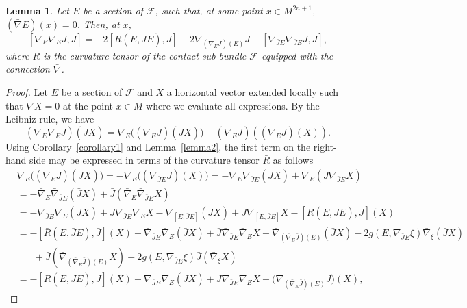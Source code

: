 \documentclass[a4paper,reqno]{amsart}
\newtheorem{lemma}[thm]{Lemma}
\theoremstyle{definition}
\theoremstyle{remark}
\theoremstyle{plain}
\numberwithin{equation}{section}
\newcommand{\f}{\mathcal{F}}
\begin{document}
\begin{lemma}\label{lemma3.2}
  Let $E$ be a section of $\f$, such that, at some point
  $x\in M^{2n+1}$, $(\bar{\nabla}E)(x)=0$. Then, at $x$,
  $$
  [\bar{\nabla}_E \bar{\nabla}_E \bar{J},\bar{J}] = -2 [\bar{R}(E,\bar{J}E),\bar{J}
  ]-2\bar{\nabla}_{(\bar{\nabla}_E \bar{J})(E)}\bar{J}- [\bar{\nabla}_{\bar{J}E}
  \bar{\nabla}_{\bar{J}E} \bar{J},\bar{J}],
  $$
where $\bar{R}$ is the curvature tensor of the contact sub-bundle
$\f$ equipped with the connection $\bar{\nabla}$.
\end{lemma}

\begin{proof}
  Let $E$ be a section of $\f$ and $X$ a horizontal vector 
  extended locally such that $\bar{\nabla} X =0$ at the point
  $x\in M$ where we evaluate all expressions.  By the Leibniz
  rule, we have
  $$
  (\bar{\nabla}_E\bar{\nabla}_E \bar{J})(\bar{J}X)=\bar{\nabla}_E
  \big((\bar{\nabla}_E \bar{J})
  (\bar{J}X)\big)-(\bar{\nabla}_{E}\bar{J})((\bar{\nabla}_E \bar{J}) (X)).
  $$
  Using Corollary~\ref{corollary1} and Lemma~\ref{lemma2}, the
  first term on the right-hand side may be expressed in terms of
  the curvature tensor $\bar{R}$ as follows
\begin{align*}
&\bar{\nabla}_E\big((\bar{\nabla}_E \bar{J}) (\bar{J}X)\big)  = -\bar{\nabla}_E\big((\bar{\nabla}_{\bar{J}E}\bar{J}) (X)\big) 
 =-\bar{\nabla}_E\bar{\nabla}_{\bar{J}E}(\bar{J}X)+\bar{\nabla}_E(\bar{J}\bar{\nabla}_{\bar{J}E}
  X) \\
  &= -\bar{\nabla}_E\bar{\nabla}_{\bar{J}E}(\bar{J}X)+ \bar{J}(\bar{\nabla}_{E}\bar{\nabla}_{\bar{J}E}X)\\ 
& =-\bar{\nabla}_{\bar{J}E}\bar{\nabla}_E(\bar{J}X)+\bar{J}\bar{\nabla}_{\bar{J}E}\bar{\nabla}_E X -\bar{\nabla}_{[E,\bar{J}E]}(\bar{J}X)+ \bar{J}\bar{\nabla}_{[E,\bar{J}E]}X-[\bar{R}(E,\bar{J}E),\bar{J}](X)\\
&= -[\bar{R}(E,\bar{J}E),\bar{J}](X)  -\bar{\nabla}_{\bar{J}E}\bar{\nabla}_E(\bar{J}X)+\bar{J}\bar{\nabla}_{\bar{J}E}\bar{\nabla}_E  X - \bar{\nabla}_{(\bar{\nabla}_E \bar{J})(E)}(\bar{J}X)
  - 2g(  E, \nabla_{\bar{J} E}\xi) \bar{\nabla}_{\xi} (\bar{J}X)
  \\ & \phantom{xxx}+\bar{J}(\bar{\nabla}_{(\bar{\nabla}_E \bar{J})(E)}X)
+2g(  E, \nabla_{\bar{J} E}\xi) \bar{J}(\bar{\nabla}_{\xi}X)\\
  & =  -[\bar{R}(E,\bar{J}E),\bar{J}](X)  -\bar{\nabla}_{\bar{J}E}\bar{\nabla}_E(\bar{J}X)+\bar{J}\bar{\nabla}_{\bar{J}E}\bar{\nabla}_E X - \big(\bar{\nabla}_{(\bar{\nabla}_E \bar{J})(E)}\bar{J}\big)(X),

\end{align*}
\end{proof}
\end{document}
